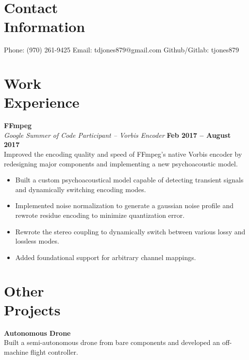 \documentclass[margin,line]{resume}
\begin{document}
\begin{resume}
    \section{\mysidestyle Contact\\Information}

    Phone: (970) 261-9425 \hfill Email: tdjones879@gmail.com  \hfill Github/Gitlab: tjones879\vspace{0mm}\\\vspace{-4.5mm}

    \section{\mysidestyle Work\\Experience}

    \textbf{FFmpeg} \vspace{2mm}\\\vspace{1mm}%
    \textsl{Google Summer of Code Participant -- Vorbis Encoder} \hfill \textbf{Feb 2017 -- August 2017}\\
    Improved the encoding quality and speed of FFmpeg's native Vorbis
    encoder by redesigning major components and implementing a new
    psychoacoustic model.

	\begin{itemize}
	\item Built a custom psychoacoustical model capable of detecting
              transient signals and dynamically switching encoding modes.
	\item Implemented noise normalization to generate a gaussian noise
	      profile and rewrote residue encoding to minimize quantization
	      error.
	\item Rewrote the stereo coupling to dynamically switch between
	      various lossy and lossless modes.
	\item Added foundational support for arbitrary channel mappings.
	\end{itemize}

    \section{\mysidestyle Other\\Projects}

    \textbf{Autonomous Drone}\\
    Built a semi-autonomous drone from bare components and developed an
    off-machine flight controller.


\end{resume}
\end{document}
